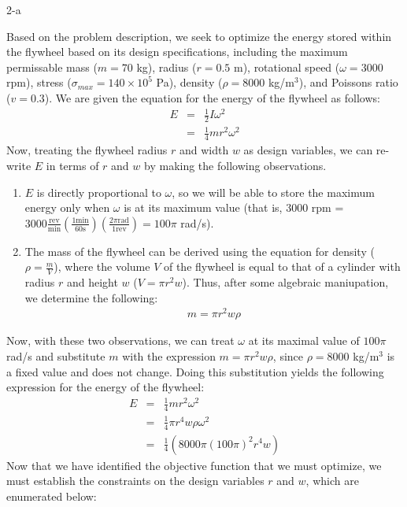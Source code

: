\documentclass[11pt]{article}
\begin{document}
\begin{problem}{2-a}
\end{problem}
\begin{solution}

Based on the problem description, we seek to optimize the energy stored within the flywheel based on its design specifications, including the maximum permissable mass ($m = 70$ kg), radius ($r = 0.5$ m), rotational speed ($\omega = 3000$ rpm), stress ($\sigma_{max} = 140 \times 10^5$ Pa), density ($\rho = 8000$ kg/m$^3$), and Poissons ratio ($v = 0.3$). We are given the equation for the energy of the flywheel as follows:
\begin{eqnarray*}
E & = & \frac{1}{2}I\omega^2 \\
& = & \frac{1}{4}mr^2\omega^2
\end{eqnarray*}
Now, treating the flywheel radius $r$ and width $w$ as design variables, we can re-write $E$ in terms of $r$ and $w$ by making the following observations.
\begin{enumerate}
	\item $E$ is directly proportional to $\omega$, so we will be able to store the maximum energy only when $\omega$ is at its maximum value (that is, $3000$ rpm = $3000\frac{\text{rev}}{\text{min}}(\frac{1\text{min}}{60\text{s}})(\frac{2\pi \text{rad}}{1 \text{rev}}) = 100\pi$ rad/s).
	\item The mass of the flywheel can be derived using the equation for density ($\rho = \frac{m}{V}$), where the volume $V$ of the flywheel is equal to that of a cylinder with radius $r$ and height $w$ ($V = \pi r^2 w$). Thus, after some algebraic maniupation, we determine the following:
\begin{eqnarray*}
m = \pi r^2 w \rho
\end{eqnarray*} 
\end{enumerate}
Now, with these two observations, we can treat $\omega$ at its maximal value of $100\pi$ rad/s and substitute $m$ with the expression $m = \pi r^2 w \rho$, since $\rho = 8000$ kg/m$^3$ is a fixed value and does not change. Doing this substitution yields the following expression for the energy of the flywheel:
\begin{eqnarray*}
E & = & \frac{1}{4}mr^2\omega^2 \\
& = &\frac{1}{4}\pi r^4 w \rho \omega^2 \\
& = & \frac{1}{4}(8000\pi(100\pi)^2r^4 w) 
\end{eqnarray*}
Now that we have identified the objective function that we must optimize, we must establish the constraints on the design variables $r$ and $w$, which are enumerated below:

\end{solution}
\end{document}
